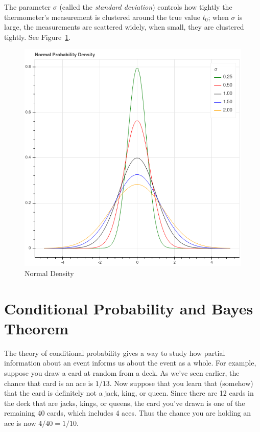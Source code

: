 \documentclass[
  11pt,
  letterpaper,
]{scrbook}
\theoremstyle{plain}
\theoremstyle{plain}
\theoremstyle{remark}
\begin{document}
The parameter \(\sigma\) (called the \emph{standard deviation}) controls
how tightly the thermometer's measurement is clustered around the true
value \(t_0\); when \(\sigma\) is large, the measurements are scattered
widely, when small, they are clustered tightly. See
Figure~\ref{fig-density}.

\begin{figure}

{\centering \includegraphics{chapters/img/density.png}

}

\caption{\label{fig-density}Normal Density}

\end{figure}

\hypertarget{conditional-probability-and-bayes-theorem}{%
\section{Conditional Probability and Bayes
Theorem}\label{conditional-probability-and-bayes-theorem}}

The theory of conditional probability gives a way to study how partial
information about an event informs us about the event as a whole. For
example, suppose you draw a card at random from a deck. As we've seen
earlier, the chance that card is an ace is \(1/13\). Now suppose that
you learn that (somehow) that the card is definitely not a jack, king,
or queen. Since there are 12 cards in the deck that are jacks, kings, or
queens, the card you've drawn is one of the remaining 40 cards, which
includes 4 aces. Thus the chance you are holding an ace is now
\(4/40=1/10\).
\end{document}
